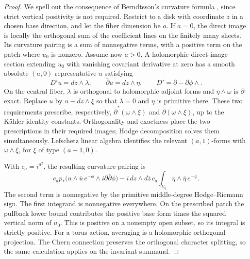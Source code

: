 \begin{proof}
We spell out the consequence of Berndtsson's curvature formula
\cite[Section 4, Proposition 4.2, Lemmas 4.3--4.4, and equation (4.8)]{Berndtsson2009},
since strict vertical positivity is not required.  Restrict to a disk
with coordinate $z$ in a chosen base direction, and let the fiber
dimension be $a$. If $a=0$, the direct image is locally the orthogonal
sum of the coefficient lines on the finitely many sheets. Its
curvature pairing is a sum of nonnegative terms, with a positive
term on the patch where $u_0$ is nonzero. Assume now $a>0$.
A holomorphic direct-image section extending $u_0$
with vanishing covariant derivative at zero has a smooth absolute
$(a,0)$ representative $u$ satisfying
\[
 D'u=dz\wedge\lambda,\qquad
 \bar\partial u=dz\wedge\eta,
 \qquad D'=\partial-\partial\phi\wedge.
\]
On the central fiber, $\lambda$ is orthogonal to holomorphic adjoint
forms and $\eta\wedge\omega$ is $\bar\partial$-exact.
Replace $u$ by $u-dz\wedge\xi$ so that $\lambda=0$ and
$\eta$ is primitive there.  These two requirements prescribe,
respectively, $\bar\partial^*(\omega\wedge\xi)$ and
$\bar\partial(\omega\wedge\xi)$, up to the K\"ahler-identity
constants.  Orthogonality and exactness place the two prescriptions
in their required images; Hodge decomposition solves them
simultaneously.  Lefschetz linear algebra identifies the relevant
$(a,1)$-forms with $\omega\wedge\xi$, for $\xi$ of type
$(a-1,0)$.

With $c_a=i^{a^2}$, the resulting curvature pairing is
\[
 c_a p_*\bigl(u\wedge\bar u\,e^{-\phi}
                   \wedge i\partial\bar\partial\phi\bigr)
 -i\,dz\wedge d\bar z\,c_a
       \int_{V_0}\eta\wedge\bar\eta\,e^{-\phi}.
\]
The second term is nonnegative by the primitive middle-degree
Hodge--Riemann sign. The first integrand is nonnegative everywhere.
On the prescribed patch the pullback lower bound contributes the
positive base form times the squared vertical norm of $u_0$.
This is positive on a nonempty open subset, so its integral is
strictly positive. For a torus action, averaging
is a holomorphic orthogonal projection.  The Chern connection
preserves the orthogonal character splitting, so the same calculation
applies on the invariant summand.
\end{proof}

